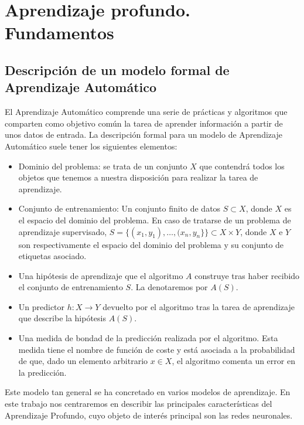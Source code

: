 \chapter{Aprendizaje profundo. Fundamentos}\label{ch:quinto-capitulo}

\section{Descripción de un modelo formal de Aprendizaje Automático}\label{sec:4.1}

El Aprendizaje Automático comprende una serie de prácticas y algoritmos que comparten como objetivo común la tarea de aprender información a partir de unos datos de entrada.  La descripción formal para un modelo de Aprendizaje Automático suele tener los siguientes elementos: 

\begin{itemize}
\item Dominio del problema: se trata de un conjunto $X$ que contendrá todos los objetos que tenemos a nuestra disposición para realizar la tarea de aprendizaje. 
\item Conjunto de entrenamiento: Un conjunto finito de datos $S\subset X$, donde $X$ es el espacio del dominio del problema. En caso de tratarse de un problema de aprendizaje supervisado, $S=\{(x_{1},y_{1}),\ldots,(x_{n},y_{n}\}\}\subset X\times Y$, donde $X$ e $Y$ son respectivamente el espacio del dominio del problema y su conjunto de etiquetas asociado. 
\item Una hipótesis de aprendizaje que el algoritmo $A$ construye tras haber recibido el conjunto de entrenamiento $S$. La denotaremos por $A(S)$.
\item Un predictor $h:X\rightarrow Y$ devuelto por el algoritmo tras la tarea de aprendizaje que describe la hipótesis $A(S)$.
\item Una medida de bondad de la predicción realizada por el algoritmo. Esta medida tiene el nombre de función de coste y está asociada a la probabilidad de que, dado un elemento arbitrario $x\in X$, el algoritmo comenta un error en la predicción.
\end{itemize}

Este modelo tan general se ha concretado en varios modelos de aprendizaje. En este trabajo nos centraremos en describir las principales características del Aprendizaje Profundo, cuyo objeto de interés principal son las redes neuronales.


